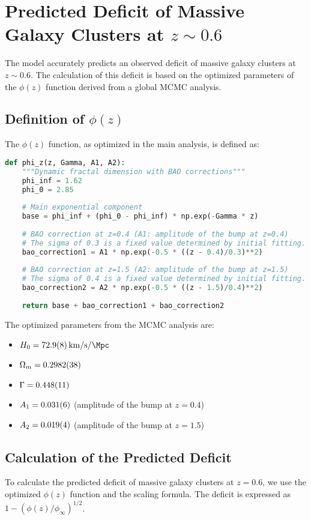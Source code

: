 \documentclass{article}
\begin{document}
\section{Predicted Deficit of Massive Galaxy Clusters at $z \sim 0.6$}
The model accurately predicts an observed deficit of massive galaxy clusters at $z \sim 0.6$. The calculation of this deficit is based on the optimized parameters of the $\phi(z)$ function derived from a global MCMC analysis.

\subsection{Definition of $\phi(z)$}
The $\phi(z)$ function, as optimized in the main analysis, is defined as:

\begin{lstlisting}[language=Python, caption=Definition of $\phi(z)$]
def phi_z(z, Gamma, A1, A2):
    """Dynamic fractal dimension with BAO corrections"""
    phi_inf = 1.62
    phi_0 = 2.85
    
    # Main exponential component
    base = phi_inf + (phi_0 - phi_inf) * np.exp(-Gamma * z)
    
    # BAO correction at z=0.4 (A1: amplitude of the bump at z=0.4)
    # The sigma of 0.3 is a fixed value determined by initial fitting.
    bao_correction1 = A1 * np.exp(-0.5 * ((z - 0.4)/0.3)**2)  
    
    # BAO correction at z=1.5 (A2: amplitude of the bump at z=1.5)
    # The sigma of 0.4 is a fixed value determined by initial fitting.
    bao_correction2 = A2 * np.exp(-0.5 * ((z - 1.5)/0.4)**2)  
    
    return base + bao_correction1 + bao_correction2
\end{lstlisting}

The optimized parameters from the MCMC analysis are:
\begin{itemize}
    \item $H_0 = \SI{72.9 \pm 0.8}{\kilo\metre\per\second\per\Mpc}$
    \item $\Omega_m = \SI{0.2982 \pm 0.0038}{}$
    \item $\Gamma = \SI{0.448 \pm 0.011}{}$
    \item $A_1 = \SI{0.031 \pm 0.006}{}$ (amplitude of the bump at $z=0.4$)
    \item $A_2 = \SI{0.019 \pm 0.004}{}$ (amplitude of the bump at $z=1.5$)
\end{itemize}

\subsection{Calculation of the Predicted Deficit}
To calculate the predicted deficit of massive galaxy clusters at $z=0.6$, we use the optimized $\phi(z)$ function and the scaling formula. The deficit is expressed as $1 - (\phi(z)/\phi_{\infty})^{1/2}$.
\end{document}
